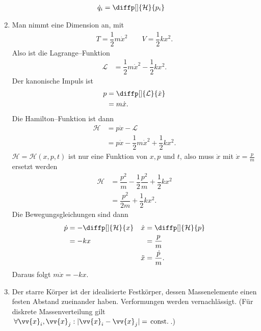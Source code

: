 \documentclass[a4paper,12pt]{article}
\numberwithin{equation}{section}
\begin{document}
\begin{enumerate}[label=\arabic*.]
\begin{align*}
                        \dot{q}_i&=\diffp[]{\mathcal{H}}{p_i}
        \end{align*} 
        \item Man nimmt eine Dimension an, mit
                \begin{align*} 
                        T=\dfrac{1}{2}m\dot{x}^2\qquad V=\dfrac{1}{2}kx^2
                .\end{align*} 
                Also ist die Lagrange--Funktion
                \begin{align*} 
                        \mathcal{L}&=\dfrac{1}{2}m\dot{x}^2-\dfrac{1}{2}kx^2
                .\end{align*} 
                Der kanonische Impuls ist
                \begin{align*} 
                        p&=\diffp[]{\mathcal{L}}{\dot{x}}\\
                         &=m\dot{x}
                .\end{align*} 
                Die Hamilton--Funktion ist dann
                \begin{align*} 
                        \mathcal{H}&=p\dot{x}-\mathcal{L}\\
                                   &=p\dot{x}-\dfrac{1}{2}m\dot{x}^2+\dfrac{1}{2}kx^2
                .\end{align*} 
                $\mathcal{H}=\mathcal{H}\left(x,p,t\right)$ ist nur eine Funktion von $x,p$ und $t$, also muss $\dot{x}$ mit $\dot{x}=\tfrac{p}{m}$ ersetzt werden
                \begin{align*} 
                        \mathcal{H}&=\dfrac{p^2}{m}-\dfrac{1}{2}\dfrac{p^2}{m}+\dfrac{1}{2}kx^2\\
                                   &=\dfrac{p^2}{2m}+\dfrac{1}{2}kx^2
                .\end{align*} 
                Die Bewegungsgleichungen sind dann
                \begin{align*} 
                        \dot{p}&=-\diffp[]{\mathcal{H}}{x}&\dot{x}&=\diffp[]{\mathcal{H}}{p}\\
                               &=-kx&&=\dfrac{p}{m}\\
                               &&\ddot{x}&=\dfrac{\dot{p}}{m}
                .\end{align*} 
                Daraus folgt $m\ddot{x}=-kx$.
        \item Der starre Körper ist der idealisierte Festkörper, dessen Massenelemente einen festen Abstand zueinander haben. Verformungen werden vernachlässigt. (Für diskrete Massenverteilung gilt $\,\forall \vv{x}_i,\vv{x}_j:|\vv{x}_i-\vv{x}_j|=\,\text{const.}\,$.)

\end{enumerate}
\end{document}
